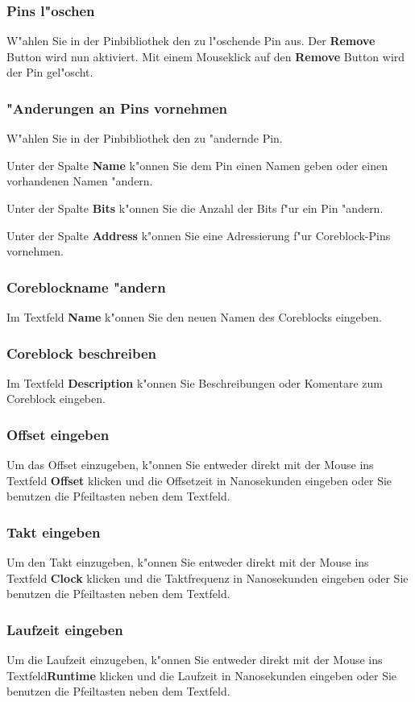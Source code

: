 \documentclass[a4paper,titlepage,12pt,ngerman]{scrbook}
\begin{document}
\subsubsection{Pins l"oschen}
W"ahlen Sie in der Pinbibliothek den zu l"oschende Pin aus. Der {\bf Remove} Button wird nun aktiviert. Mit einem Mouseklick auf den {\bf Remove} Button wird der Pin gel"oscht.
\subsubsection{"Anderungen an Pins vornehmen}
W"ahlen Sie in der Pinbibliothek den zu "andernde Pin.\par
Unter der Spalte {\bf Name} k"onnen Sie dem Pin einen Namen geben oder einen vorhandenen Namen "andern.\par
Unter der Spalte {\bf Bits} k"onnen Sie die Anzahl der Bits f"ur ein Pin "andern.\par
Unter der Spalte {\bf Address} k"onnen Sie eine Adressierung f"ur Coreblock-Pins vornehmen.\par
\subsubsection{Coreblockname "andern}
Im Textfeld {\bf Name} k"onnen Sie den neuen Namen des Coreblocks eingeben.
\subsubsection{Coreblock beschreiben}
Im Textfeld {\bf Description} k"onnen Sie Beschreibungen oder Komentare zum Coreblock eingeben.
\subsubsection{Offset eingeben}
Um das Offset einzugeben, k"onnen Sie entweder direkt mit der Mouse ins Textfeld {\bf Offset} klicken und die Offsetzeit in Nanosekunden eingeben oder Sie benutzen die Pfeiltasten neben dem Textfeld. 
\subsubsection{Takt eingeben}
Um den Takt einzugeben, k"onnen Sie entweder direkt mit der Mouse ins Textfeld {\bf Clock} klicken und die Taktfrequenz in Nanosekunden eingeben oder Sie benutzen die Pfeiltasten neben dem Textfeld. 
\subsubsection{Laufzeit eingeben}
Um die Laufzeit einzugeben, k"onnen Sie entweder direkt mit der Mouse ins Textfeld{\bf Runtime} klicken und die Laufzeit in Nanosekunden eingeben oder Sie benutzen die Pfeiltasten neben dem Textfeld. 
\end{document}
